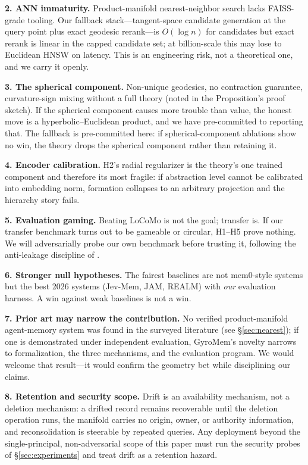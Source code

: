 \documentclass[11pt,a4paper]{article}
\begin{document}
\textbf{2. ANN immaturity.} Product-manifold nearest-neighbor search lacks
FAISS-grade tooling. Our fallback stack---tangent-space candidate
generation at the query point plus exact geodesic rerank---is $O(\log n)$
for candidates but exact rerank is linear in the capped candidate set; at
billion-scale this may lose to Euclidean HNSW on latency. This is an
engineering risk, not a theoretical one, and we carry it openly.

\textbf{3. The spherical component.} Non-unique geodesics, no contraction
guarantee, curvature-sign mixing without a full theory (noted in the
Proposition's proof sketch). If the spherical component causes more
trouble than value, the honest move is a hyperbolic--Euclidean product,
and we have pre-committed to reporting that. The fallback is
pre-committed here: if spherical-component ablations show no win, the
theory drops the spherical component rather than retaining it.

\textbf{4. Encoder calibration.} H2's radial regularizer is the theory's
one trained component and therefore its most fragile: if abstraction
level cannot be calibrated into embedding norm, formation collapses to
an arbitrary projection and the hierarchy story fails.

\textbf{5. Evaluation gaming.} Beating LoCoMo is not the goal; transfer
is. If our transfer benchmark turns out to be gameable or circular, H1--H5
prove nothing. We will adversarially probe our own benchmark before
trusting it, following the anti-leakage discipline of \cite{epistemics}.

\textbf{6. Stronger null hypotheses.} The fairest baselines are not
mem0-style systems but the best 2026 systems (Jev-Mem, JAM, REALM) with
\emph{our} evaluation harness. A win against weak baselines is not a win.

\textbf{7. Prior art may narrow the contribution.} No verified
product-manifold agent-memory system was found in the surveyed
literature (see \S\ref{sec:nearest}); if one is demonstrated under
independent evaluation, GyroMem's novelty narrows to formalization, the
three mechanisms, and the evaluation program. We would welcome that
result---it would confirm the geometry bet while disciplining our claims.

\textbf{8. Retention and security scope.} Drift is an availability
mechanism, not a deletion mechanism: a drifted record remains recoverable
until the deletion operation runs, the manifold carries no origin, owner,
or authority information, and reconsolidation is steerable by repeated
queries. Any deployment beyond the single-principal, non-adversarial
scope of this paper must run the security probes of
\S\ref{sec:experiments} and treat drift as a retention hazard.
\end{document}
